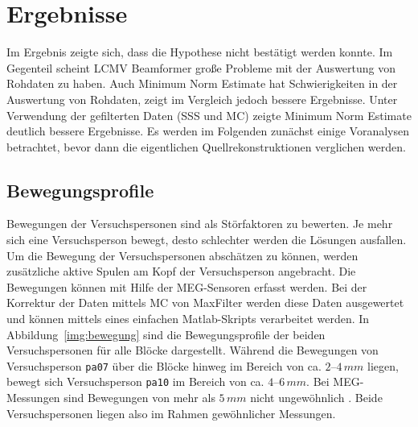 \documentclass[doc,a4paper,12pt]{apa6}
\begin{document}

\newpage
\section{Ergebnisse}
\label{sec:ergebnisse}

Im Ergebnis zeigte sich, dass die Hypothese nicht bestätigt werden konnte. Im Gegenteil scheint LCMV Beamformer große Probleme mit der Auswertung von Rohdaten zu haben. Auch Minimum Norm Estimate hat Schwierigkeiten in der Auswertung von Rohdaten, zeigt im Vergleich jedoch bessere Ergebnisse. Unter Verwendung der gefilterten Daten (SSS und MC) zeigte Minimum Norm Estimate deutlich bessere Ergebnisse. Es werden im Folgenden zunächst einige Voranalysen betrachtet, bevor dann die eigentlichen Quellrekonstruktionen verglichen werden.

\subsection{Bewegungsprofile}
\label{sec:bewegung}

Bewegungen der Versuchspersonen sind als Störfaktoren zu bewerten. Je mehr sich eine Versuchsperson bewegt, desto schlechter werden die Lösungen ausfallen. Um die Bewegung der Versuchspersonen abschätzen zu können, werden zusätzliche aktive Spulen am Kopf der Versuchsperson angebracht. Die Bewegungen können mit Hilfe der MEG-Sensoren erfasst werden. Bei der Korrektur der Daten mittels MC von MaxFilter werden diese Daten ausgewertet und können mittels eines einfachen Matlab-Skripts verarbeitet werden. In Abbildung~\ref{img:bewegung} sind die Bewegungsprofile der beiden Versuchspersonen für alle Blöcke dargestellt. Während die Bewegungen von Versuchsperson \texttt{pa07} über die Blöcke hinweg im Bereich von ca. $2$--$4\,mm$ liegen, bewegt sich Versuchsperson \texttt{pa10} im Bereich von ca. $4$--$6\,mm$. Bei MEG-Messungen sind Bewegungen von mehr als $5\,mm$ nicht ungewöhnlich \parencite{wilson2007continuous}. Beide Versuchspersonen liegen also im Rahmen gewöhnlicher Messungen.
\end{document}
